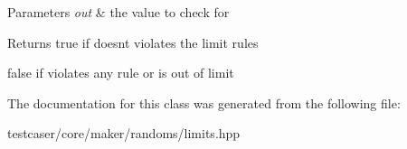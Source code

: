 \begin{DoxyParams}{Parameters}
{\em out} & the value to check for \\
\hline
\end{DoxyParams}
\begin{DoxyReturn}{Returns}
true if doesn\textquotesingle{}t violates the limit rules 

false if violates any rule or is out of limit 
\end{DoxyReturn}


The documentation for this class was generated from the following file\+:\begin{DoxyCompactItemize}
\item 
testcaser/core/maker/randoms/limits.\+hpp\end{DoxyCompactItemize}
